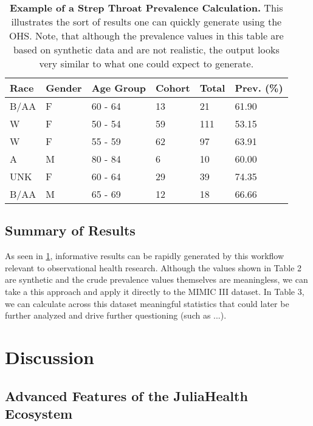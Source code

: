 \documentclass{juliacon}
\begin{document}
\begin{table}[!ht]
    \centering
    \begin{tabular}{|l|l|l|l|l|l|}
    \hline
        Race & Gender & Age Group & Cohort & Total & Prev. (\%) \\ \hline
        B/AA & F & 60 - 64 & 13 & 21 & 61.90 \\ \hline
        W & F & 50 - 54 & 59 & 111 & 53.15 \\ \hline
        W & F & 55 - 59 & 62 & 97 & 63.91 \\ \hline
        A & M & 80 - 84 & 6 & 10 & 60.00 \\ \hline
        UNK & F & 60 - 64 & 29 & 39 & 74.35 \\ \hline
        B/AA & M & 65 - 69 & 12 & 18 & 66.66 \\ \hline
    \end{tabular}
    \caption{\textbf{Example of a Strep Throat Prevalence Calculation.} This illustrates the sort of results one can quickly generate using the OHS. Note, that although the prevalence values in this table are based on synthetic data and are not realistic, the output looks very similar to what one could expect to generate.}
    \label{table:eunomia_prevalence}
\end{table}

\subsection{Summary of Results}

As seen in \ref{table:eunomia_prevalence}, informative results can be rapidly generated by this workflow relevant to observational health research.
Although the values shown in Table 2 are synthetic and the crude prevalence values themselves are meaningless, we can take a this approach and apply it directly to the MIMIC III dataset.
In Table 3, we can calculate across this dataset meaningful statistics that could later be further analyzed and drive further questioning (such as ...).

\section{Discussion}

\subsection{Advanced Features of the JuliaHealth Ecosystem}
\end{document}
